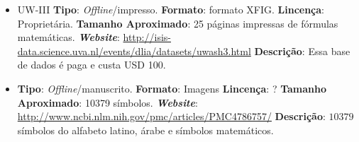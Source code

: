 \begin{itemize}
	\item UW-III \cite{phillips1998methodologies}
	\subitem \textbf{Tipo}: \textit{Offline}/impresso.
	\subitem \textbf{Formato}: formato XFIG.
	\subitem \textbf{Lincença}: Proprietária.
	\subitem \textbf{Tamanho Aproximado}: 25 páginas impressas de fórmulas matemáticas.
	\subitem \textit{\textbf{Website}}: \url{http://isis-data.science.uva.nl/events/dlia/datasets/uwash3.html}
	\subitem \textbf{Descrição}: Essa base de dados é paga e custa USD 100.
	
	\item \cite{chajri2016handwritten}
	\subitem \textbf{Tipo}: \textit{Offline}/manuscrito.
	\subitem \textbf{Formato}: Imagens
	\subitem \textbf{Lincença}: ?
	\subitem \textbf{Tamanho Aproximado}: 10379 símbolos.
	\subitem \textit{\textbf{Website}}: \url{http://www.ncbi.nlm.nih.gov/pmc/articles/PMC4786757/}
	\subitem \textbf{Descrição}: $10379$ símbolos do alfabeto latino, árabe e símbolos matemáticos.
	
\end{itemize}




\fi